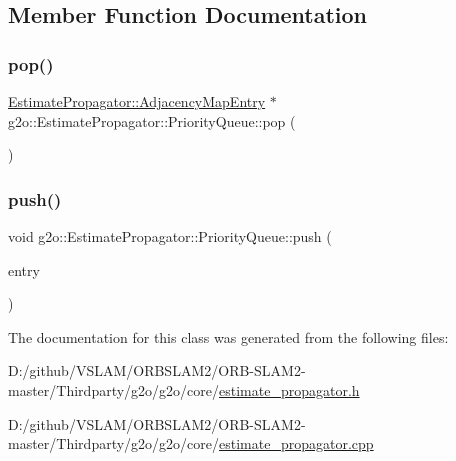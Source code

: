 \subsection{Member Function Documentation}
\mbox{\label{classg2o_1_1_estimate_propagator_1_1_priority_queue_a82a20f1ebc44dfe305f65ceae7860a85}} 
\subsubsection{\texorpdfstring{pop()}{pop()}}
{\footnotesize\ttfamily \mbox{\hyperlink{classg2o_1_1_estimate_propagator_1_1_adjacency_map_entry}{Estimate\+Propagator\+::\+Adjacency\+Map\+Entry}} $\ast$ g2o\+::\+Estimate\+Propagator\+::\+Priority\+Queue\+::pop (\begin{DoxyParamCaption}{ }\end{DoxyParamCaption})}

\mbox{\label{classg2o_1_1_estimate_propagator_1_1_priority_queue_ac89681b92b921412ff432f14028f481e}} 
\subsubsection{\texorpdfstring{push()}{push()}}
{\footnotesize\ttfamily void g2o\+::\+Estimate\+Propagator\+::\+Priority\+Queue\+::push (\begin{DoxyParamCaption}\item[{\mbox{\hyperlink{classg2o_1_1_estimate_propagator_1_1_adjacency_map_entry}{Adjacency\+Map\+Entry}} $\ast$}]{entry }\end{DoxyParamCaption})}



The documentation for this class was generated from the following files\+:\begin{DoxyCompactItemize}
\item 
D\+:/github/\+V\+S\+L\+A\+M/\+O\+R\+B\+S\+L\+A\+M2/\+O\+R\+B-\/\+S\+L\+A\+M2-\/master/\+Thirdparty/g2o/g2o/core/\mbox{\hyperlink{estimate__propagator_8h}{estimate\+\_\+propagator.\+h}}\item 
D\+:/github/\+V\+S\+L\+A\+M/\+O\+R\+B\+S\+L\+A\+M2/\+O\+R\+B-\/\+S\+L\+A\+M2-\/master/\+Thirdparty/g2o/g2o/core/\mbox{\hyperlink{estimate__propagator_8cpp}{estimate\+\_\+propagator.\+cpp}}\end{DoxyCompactItemize}
